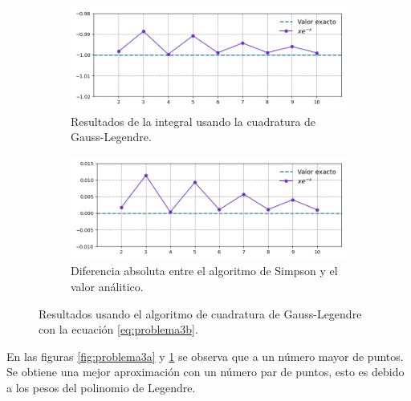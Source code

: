 \begin{enumerate}
          \begin{figure}[H]
              \centering
              \begin{subfigure}[b]{14cm}
                  \includegraphics[width=14cm]{Graphics/problema03_fun_f2.png}
                  \caption{Resultados de la integral usando la cuadratura de Gauss-Legendre.}
              \end{subfigure}
              \begin{subfigure}[b]{14cm}
                  \includegraphics[width=14cm]{Graphics/problema03_diff_f2.png}
                  \caption{Diferencia absoluta entre el algoritmo de Simpson y el valor análitico.}
              \end{subfigure}
              \caption{Resultados usando el algoritmo de cuadratura de Gauss-Legendre con la ecuación \ref{eq:problema3b}.}
              \label{fig:problema3b}
          \end{figure}
\end{enumerate}

En las figuras \ref{fig:problema3a} y \ref{fig:problema3b} se observa que a un número mayor de puntos. Se obtiene una mejor aproximación con un número par de puntos, esto es debido a los pesos del polinomio de Legendre.